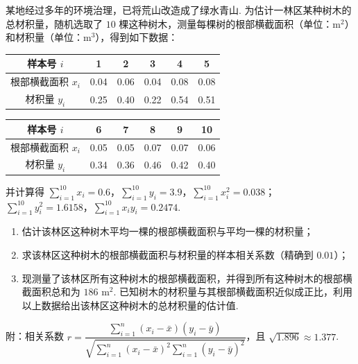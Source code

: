 \begin{problem}
某地经过多年的环境治理，已将荒山改造成了绿水青山. 为估计一林区某种树木的总材积量，随机选取了 \(10\) 棵这种树木，测量每棵树的根部横截面积（单位：\(\text{m}^2\)）和材积量（单位：\(\text{m}^3\)），得到如下数据：

\begin{center}
\begin{tabular}{c|ccccc}
样本号 \(i\) & 1 & 2 & 3 & 4 & 5 \\\hline
根部横截面积 \(x_i\) & 0.04 & 0.06 & 0.04 & 0.08 & 0.08 \\
材积量 \(y_i\) & 0.25 & 0.40 & 0.22 & 0.54 & 0.51 \\
\end{tabular}

\vspace{0.5em}

\begin{tabular}{c|cccc|c}
样本号 \(i\) & 6 & 7 & 8 & 9 & 10 \\\hline
根部横截面积 \(x_i\) & 0.05 & 0.05 & 0.07 & 0.07 & 0.06 \\
材积量 \(y_i\) & 0.34 & 0.36 & 0.46 & 0.42 & 0.40 \\
\end{tabular}
\end{center}

并计算得 \(\sum_{i=1}^{10}x_i=0.6\)，\(\sum_{i=1}^{10}y_i=3.9\)，\(\sum_{i=1}^{10}x_i^2=0.038\)；
\(\sum_{i=1}^{10}y_i^2=1.6158\)，\(\sum_{i=1}^{10}x_iy_i=0.2474\).

\begin{enumerate}
\item 估计该林区这种树木平均一棵的根部横截面积与平均一棵的材积量；
\item 求该林区这种树木的根部横截面积与材积量的样本相关系数（精确到 \(0.01\)）；
\item 现测量了该林区所有这种树木的根部横截面积，并得到所有这种树木的根部横截面积总和为 \(186\text{ m}^2\). 已知树木的材积量与其根部横截面积近似成正比，利用以上数据给出该林区这种树木的总材积量的估计值.
\end{enumerate}

附：相关系数 \(r=\dfrac{\sum_{i=1}^n(x_i-\bar{x})(y_i-\bar{y})}{\sqrt{\sum_{i=1}^n(x_i-\bar{x})^2\sum_{i=1}^n(y_i-\bar{y})^2}}\)，且 \(\sqrt{1.896}\approx1.377\).
\end{problem}

